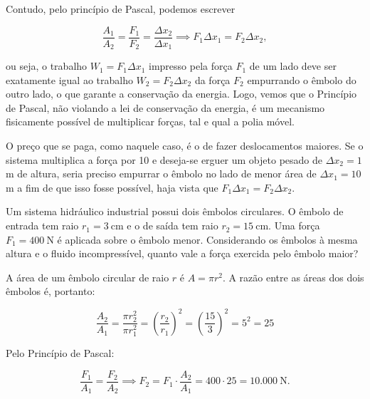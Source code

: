 Contudo, pelo princípio de Pascal, podemos escrever

$$ \dfrac{A_1}{A_2}  =  \dfrac{F_1}{F_2} =  \dfrac{\Delta x_2}{\Delta x_1} \implies F_1 \Delta x_1 = F_2 \Delta x_2 ,$$

\noindent ou seja, o trabalho $W_1 =F_1 \Delta x_1 $ impresso pela força $F_1$ de um lado deve ser exatamente igual ao trabalho $W_2 =F_2 \Delta x_2 $ da força $F_2$ empurrando o êmbolo do outro lado, o que garante a conservação da energia. Logo, vemos que o Princípio de Pascal, não violando a lei de conservação da energia, é um mecanismo fisicamente possível de multiplicar forças, tal e qual a polia móvel.

O preço que se paga, como naquele caso, é o de fazer deslocamentos maiores. Se o sistema multiplica a força por 10 e deseja-se erguer um objeto pesado de $\Delta x_2 =1 $m  de altura, seria preciso empurrar o êmbolo no lado de menor área de $\Delta x_1 = 10$m a fim de que isso fosse possível, haja vista que $F_1 \Delta x_1 = F_2 \Delta x_2.$




\vspace{0.3cm}

\begin{exemplo}[Nível I]\label{exemplo_fluidos_pascalex01}


Um sistema hidráulico industrial possui dois êmbolos circulares. O
êmbolo de entrada tem raio $r_1 = 3\ \text{cm}$ e o de saída tem raio
$r_2 = 15\ \text{cm}$. Uma força $F_1 = 400\ \text{N}$ é aplicada sobre
o êmbolo menor. Considerando os êmbolos à mesma altura e o fluido
incompressível, quanto vale a força exercida pelo êmbolo maior?

\resolucao

A área de um êmbolo circular de raio $r$ é $A = \pi r^2$. A razão entre
as áreas dos dois êmbolos é, portanto:

\begin{equation}
    \frac{A_2}{A_1} \nonumber
    = \frac{\pi r_2^2}{\pi r_1^2}
    = \left(\frac{r_2}{r_1}\right)^{\!2}
    = \left(\frac{15}{3}\right)^{\!2}
    = 5^2
    = 25
\end{equation}

Pelo Princípio de Pascal:

\begin{equation}
    \frac{F_1}{A_1} = \frac{F_2}{A_2} \nonumber
    \implies
    F_2 = F_1 \cdot \frac{A_2}{A_1} = 400 \cdot 25
    = 10.000\ \text{N}.
\end{equation}

\end{exemplo}

